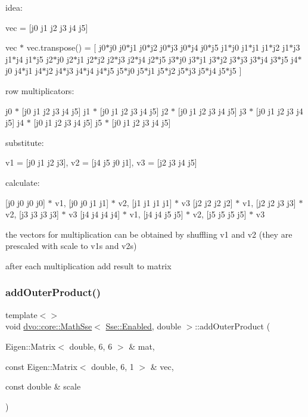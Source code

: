 idea\+:

vec = \mbox{[}j0 j1 j2 j3 j4 j5\mbox{]}

vec $\ast$ vec.\+transpose() = \mbox{[} j0$\ast$j0 j0$\ast$j1 j0$\ast$j2 j0$\ast$j3 j0$\ast$j4 j0$\ast$j5 j1$\ast$j0 j1$\ast$j1 j1$\ast$j2 j1$\ast$j3 j1$\ast$j4 j1$\ast$j5 j2$\ast$j0 j2$\ast$j1 j2$\ast$j2 j2$\ast$j3 j2$\ast$j4 j2$\ast$j5 j3$\ast$j0 j3$\ast$j1 j3$\ast$j2 j3$\ast$j3 j3$\ast$j4 j3$\ast$j5 j4$\ast$j0 j4$\ast$j1 j4$\ast$j2 j4$\ast$j3 j4$\ast$j4 j4$\ast$j5 j5$\ast$j0 j5$\ast$j1 j5$\ast$j2 j5$\ast$j3 j5$\ast$j4 j5$\ast$j5 \mbox{]}

row multiplicators\+:

j0 $\ast$ \mbox{[}j0 j1 j2 j3 j4 j5\mbox{]} j1 $\ast$ \mbox{[}j0 j1 j2 j3 j4 j5\mbox{]} j2 $\ast$ \mbox{[}j0 j1 j2 j3 j4 j5\mbox{]} j3 $\ast$ \mbox{[}j0 j1 j2 j3 j4 j5\mbox{]} j4 $\ast$ \mbox{[}j0 j1 j2 j3 j4 j5\mbox{]} j5 $\ast$ \mbox{[}j0 j1 j2 j3 j4 j5\mbox{]}

substitute\+:

v1 = \mbox{[}j0 j1 j2 j3\mbox{]}, v2 = \mbox{[}j4 j5 j0 j1\mbox{]}, v3 = \mbox{[}j2 j3 j4 j5\mbox{]}

calculate\+:

\mbox{[}j0 j0 j0 j0\mbox{]} $\ast$ v1, \mbox{[}j0 j0 j1 j1\mbox{]} $\ast$ v2, \mbox{[}j1 j1 j1 j1\mbox{]} $\ast$ v3 \mbox{[}j2 j2 j2 j2\mbox{]} $\ast$ v1, \mbox{[}j2 j2 j3 j3\mbox{]} $\ast$ v2, \mbox{[}j3 j3 j3 j3\mbox{]} $\ast$ v3 \mbox{[}j4 j4 j4 j4\mbox{]} $\ast$ v1, \mbox{[}j4 j4 j5 j5\mbox{]} $\ast$ v2, \mbox{[}j5 j5 j5 j5\mbox{]} $\ast$ v3

the vectors for multiplication can be obtained by shuffling v1 and v2 (they are prescaled with scale to v1s and v2s)

after each multiplication add result to matrix\mbox{\label{classdvo_1_1core_1_1_math_sse_a8403622e21ba348610e4ca96d7c1915c}} 
\subsubsection{\texorpdfstring{add\+Outer\+Product()}{addOuterProduct()}\hspace{0.1cm}{\footnotesize\ttfamily [4/5]}}
{\footnotesize\ttfamily template$<$$>$ \\
void \mbox{\hyperlink{classdvo_1_1core_1_1_math_sse}{dvo\+::core\+::\+Math\+Sse}}$<$ \mbox{\hyperlink{structdvo_1_1core_1_1_sse_a4fd9b55a1ec035f837cc78f33d45a9adadefbacd4d80d2e8ba64c1583a4fda95a}{Sse\+::\+Enabled}}, double $>$\+::add\+Outer\+Product (\begin{DoxyParamCaption}\item[{Eigen\+::\+Matrix$<$ double, 6, 6 $>$ \&}]{mat,  }\item[{const Eigen\+::\+Matrix$<$ double, 6, 1 $>$ \&}]{vec,  }\item[{const double \&}]{scale }\end{DoxyParamCaption})}


